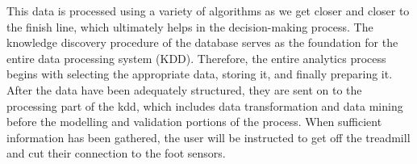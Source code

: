 This data is processed using a variety of algorithms as we get closer and closer to the finish line, which ultimately helps in the decision-making process. The knowledge discovery procedure of the database serves as the foundation for the entire data processing system (KDD). Therefore, the entire analytics process begins with selecting the appropriate data, storing it, and finally preparing it. After the data have been adequately structured, they are sent on to the processing part of the \ac{kdd}, which includes data transformation and data mining before the modelling and validation portions of the process. When sufficient information has been gathered, the user will be instructed to get off the treadmill and cut their connection to the foot sensors.
\bigskip